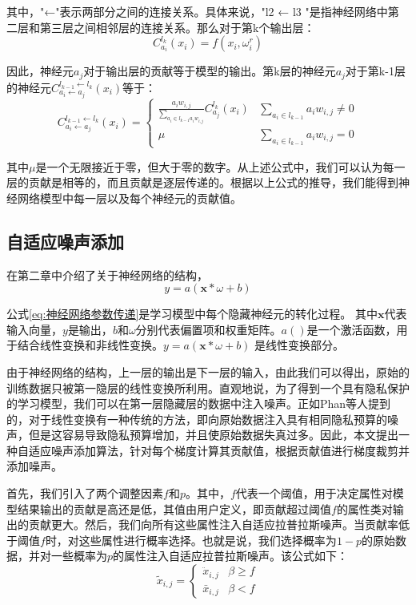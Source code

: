 其中，"←"表示两部分之间的连接关系。具体来说，"l2 ← l3 "是指神经网络中第二层和第三层之间相邻层的连接关系。那么对于第k个输出层：
\begin{equation}
C_{a_{i}}^{l_{k}}\left(x_{i}\right)=f\left(x_{i},\omega_{i}^{r}\right)
\end{equation}

因此，神经元$a_{j}$对于输出层的贡献等于模型的输出。第k层的神经元$a_{j}$对于第k-1层的神经元$C_{a_{i} \leftarrow a_{j}}^{l_{k-1} \leftarrow l_{k}}\left(x_{i}\right)$等于：
\begin{equation}
C_{a_{i} \leftarrow a_{j}}^{l_{k-1} \leftarrow l_{k}}\left(x_{i}\right)=\left\{\begin{array}{cc}\frac{a_{i} w_{i, j}}{\sum_{a_{i} \in l_{k-1} a_{i} w_{i, j}}} C_{a_{j}}^{l_{k}}\left(x_{i}\right) & \sum_{a_{i} \in l_{k-1}} a_{i} w_{i, j} \neq 0 \\ \mu & \sum_{a_{i} \in l_{k-1}} a_{i} w_{i, j}=0\end{array}\right.
\end{equation}

其中$\mu$是一个无限接近于零，但大于零的数字。从上述公式中，我们可以认为每一层的贡献是相等的，而且贡献是逐层传递的。根据以上公式的推导，我们能得到神经网络模型中每一层以及每个神经元的贡献值。


\subsection{自适应噪声添加}
在第二章中介绍了关于神经网络的结构，
\begin{equation}\label{eq:神经网络参数传递}
y=a(\mathbf{x} * \omega+b)
\end{equation}

公式\ref{eq:神经网络参数传递}是学习模型中每个隐藏神经元的转化过程。
其中$\mathbf{x}$代表输入向量，$y$是输出，$b$和$\omega$分别代表偏置项和权重矩阵。$a()$是一个激活函数，用于结合线性变换和非线性变换。$y=a(\mathbf{x} * \omega+b)$ 是线性变换部分。

由于神经网络的结构，上一层的输出是下一层的输入，由此我们可以得出，原始的训练数据只被第一隐层的线性变换所利用。直观地说，为了得到一个具有隐私保护的学习模型，我们可以在第一层隐藏层的数据中注入噪声。正如Phan等人提到的，对于线性变换有一种传统的方法，即向原始数据注入具有相同隐私预算的噪声，但是这容易导致隐私预算增加，并且使原始数据失真过多。因此，本文提出一种自适应噪声添加算法，针对每个梯度计算其贡献值，根据贡献值进行梯度裁剪并添加噪声。

首先，我们引入了两个调整因素$f$和$p$。其中，$f$代表一个阈值，用于决定属性对模型结果输出的贡献是高还是低，其值由用户定义，即贡献超过阈值$f$的属性类对输出的贡献更大。然后，我们向所有这些属性注入自适应拉普拉斯噪声。当贡献率低于阈值$f$时，对这些属性进行概率选择。也就是说，我们选择概率为$1-p$的原始数据，并对一些概率为$p$的属性注入自适应拉普拉斯噪声。该公式如下：
\begin{equation}\label{eq:神经网络加噪}
\tilde{x}_{i, j}=\left\{\begin{array}{ll}
\ddot{x}_{i, j} & \beta \geq f \\
\bar{x}_{i, j} & \beta<f
\end{array}\right.
\end{equation}


